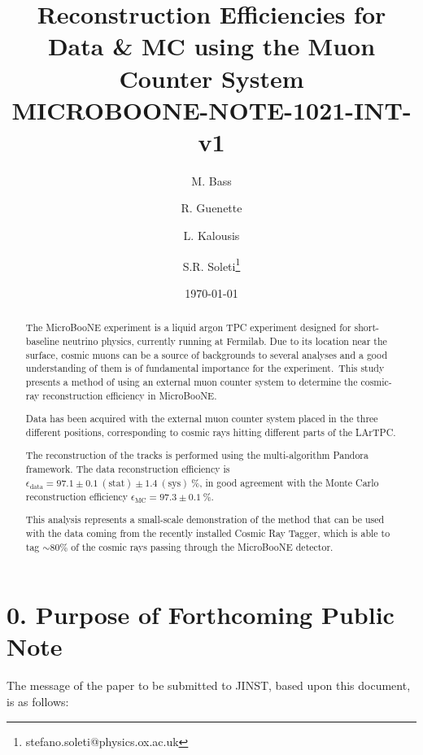 \documentclass[a4paper]{scrartcl}
\title{Reconstruction Efficiencies for Data \& MC using the Muon Counter System \\ \vspace{1em} \small{\textbf{MICROBOONE-NOTE-1021-INT-v1}}}
\author[1]{M. Bass}
\author[1]{R. Guenette}
\author[2]{L. Kalousis}
\author[1]{S.R. Soleti\thanks{stefano.soleti@physics.ox.ac.uk}}
\affil[1]{\emph{\small{University of Oxford, Oxford OX1 3RH, United Kingdom}}}
\affil[2]{\emph{\small{Vrije Universiteit, Brussels 1050, Belgium}}}
\date{\today}
\begin{document}
\maketitle
\begin{abstract}
  The MicroBooNE experiment is a liquid argon TPC experiment designed for short-baseline neutrino physics, currently running at Fermilab. Due to its location near the surface, cosmic muons can be a source of backgrounds to several analyses and a good understanding of them is of fundamental importance for the experiment. This study presents a method of using an external muon counter system to determine the cosmic-ray reconstruction efficiency in MicroBooNE.

  Data has been acquired with the external muon counter system placed in the three different positions, corresponding to cosmic rays hitting different parts of the LArTPC.

  The reconstruction of the tracks is performed using the multi-algorithm Pandora framework. The data reconstruction efficiency is $\epsilon_{\mathrm{data}}=97.1\pm0.1~(\mathrm{stat}) \pm 1.4~(\mathrm{sys})~\%$, in good agreement with the Monte Carlo reconstruction efficiency $\epsilon_{\mathrm{MC}} = 97.3\pm0.1~\%$.


  This analysis represents a small-scale demonstration of the method that can be used with the data coming from the recently installed Cosmic Ray Tagger, which is able to tag $\sim80\%$ of the cosmic rays passing through the MicroBooNE detector.
\end{abstract}

\tableofcontents

\clearpage{}

\section*{0. Purpose of Forthcoming Public Note}

The message of the paper to be submitted to JINST, based upon this document, is as follows:
\end{document}
